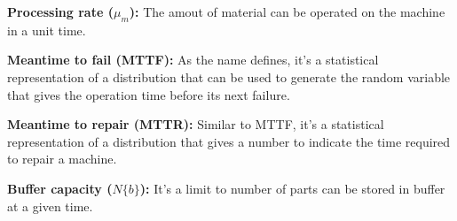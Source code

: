 \textbf{Processing rate ($\mu_m$):} The amout of material can be operated on the machine in a unit time. \par
\textbf{Meantime to fail (MTTF):} As the name defines, it's a statistical representation of a distribution that can be used to generate the random variable that gives the operation time before its next failure.\par
\textbf{Meantime to repair (MTTR):} Similar to MTTF, it's a statistical representation of a distribution that gives a number to indicate the time required to repair a machine.\par
\textbf{Buffer capacity ($N \lbrace b  \rbrace$):} It's a limit to number of parts can be stored in buffer at a given time.